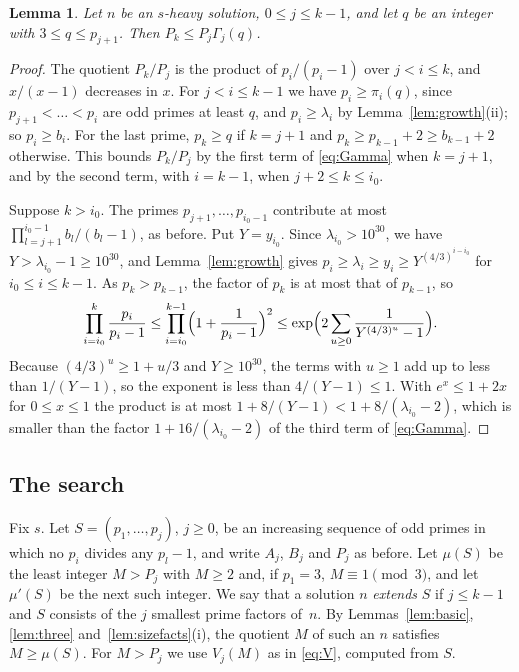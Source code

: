 \documentclass[11pt,reqno]{amsart}
\numberwithin{equation}{section}
\theoremstyle{plain}
\newtheorem{lemma}[theorem]{Lemma}
\theoremstyle{definition}
\theoremstyle{remark}
\begin{document}
\begin{lemma}\label{lem:ext}
Let $n$ be an $s$-heavy solution, $0\le j\le k-1$, and let $q$ be an
integer with $3\le q\le p_{j+1}$. Then $P_k\le P_j\Gamma_j(q)$.
\end{lemma}

\begin{proof}
The quotient $P_k/P_j$ is the product of $p_i/(p_i-1)$ over
$j<i\le k$, and $x/(x-1)$ decreases in $x$. For $j<i\le k-1$ we have
$p_i\ge\pi_i(q)$, since $p_{j+1}<\dots<p_i$ are odd primes at least
$q$, and $p_i\ge\lambda_i$ by Lemma~\ref{lem:growth}(ii); so
$p_i\ge b_i$. For the last prime, $p_k\ge q$ if $k=j+1$ and
$p_k\ge p_{k-1}+2\ge b_{k-1}+2$ otherwise. This bounds $P_k/P_j$ by
the first term of \eqref{eq:Gamma} when $k=j+1$, and by the second
term, with $i=k-1$, when $j+2\le k\le i_0$.

Suppose $k>i_0$. The primes $p_{j+1},\dots,p_{i_0-1}$ contribute at
most $\prod_{l=j+1}^{i_0-1}b_l/(b_l-1)$, as before. Put $Y=y_{i_0}$.
Since $\lambda_{i_0}>10^{30}$, we have $Y>\lambda_{i_0}-1\ge10^{30}$,
and Lemma~\ref{lem:growth} gives
$p_i\ge\lambda_i\ge y_i\ge Y^{(4/3)^{i-i_0}}$ for $i_0\le i\le k-1$.
As $p_k>p_{k-1}$, the factor of $p_k$ is at most that of $p_{k-1}$,
so
\[
  \prod_{i=i_0}^{k}\frac{p_i}{p_i-1}
  \le\prod_{i=i_0}^{k-1}\Bigl(1+\frac1{p_i-1}\Bigr)^{2}
  \le\exp\Bigl(2\sum_{u\ge0}\frac1{Y^{(4/3)^u}-1}\Bigr).
\]
Because $(4/3)^u\ge1+u/3$ and $Y\ge10^{30}$, the terms with $u\ge1$
add up to less than $1/(Y-1)$, so the exponent is less than
$4/(Y-1)\le1$. With $e^x\le1+2x$ for $0\le x\le1$ the product is at
most $1+8/(Y-1)<1+8/(\lambda_{i_0}-2)$, which is smaller than the
factor $1+16/(\lambda_{i_0}-2)$ of the third term of \eqref{eq:Gamma}.
\end{proof}

\subsection{The search}\label{sec:sizesearch}
Fix $s$. Let $S=(p_1,\dots,p_j)$, $j\ge0$, be an increasing sequence
of odd primes in which no $p_i$ divides any $p_l-1$, and write $A_j$,
$B_j$ and $P_j$ as before. Let $\mu(S)$ be the least integer $M>P_j$
with $M\ge2$ and, if $p_1=3$, $M\equiv1\pmod3$, and let $\mu'(S)$ be
the next such integer. We say that a solution $n$ \emph{extends} $S$
if $j\le k-1$ and $S$ consists of the $j$ smallest prime factors
of~$n$. By Lemmas~\ref{lem:basic}, \ref{lem:three}
and~\ref{lem:sizefacts}(i), the quotient $M$ of such an $n$ satisfies
$M\ge\mu(S)$. For $M>P_j$ we use $V_j(M)$ as in \eqref{eq:V},
computed from $S$.
\end{document}
